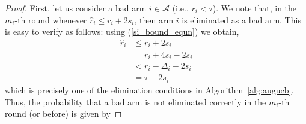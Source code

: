 \begin{proof}
First, let us consider a bad arm $i\in\mathcal{A}$ (i.e., $r_i<\tau$). We note that, in the $m_i$-th round  whenever 
$\hat{r}_i \le r_i +2s_i$, then arm $i$ is eliminated as a bad arm. This is easy to verify as follows: using (\ref{si_bound_equn}) we obtain,
\begin{align*}
\hat{r}_{i}&\leq r_{i} + 2s_{i} \\
&= r_{i} + 4s_{i} - 2s_{i} \\
&< r_{i} - \Delta_{i} - 2s_{i} \\
&= \tau - 2s_{i} %
\end{align*}
which is precisely one of the elimination conditions in Algorithm~\ref{alg:augucb}. Thus, the probability that a bad arm is not eliminated correctly in the $m_i$-th round (or before) is given by

%
%
%
%
%
%
%
%








\end{proof}
